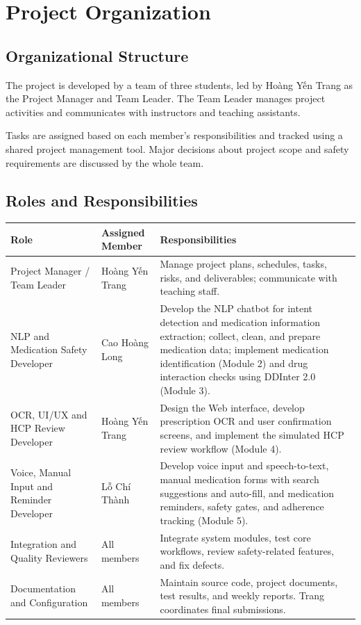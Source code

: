 
\section{Project Organization}

\subsection{Organizational Structure}

The project is developed by a team of three students,
led by Hoàng Yến Trang as the Project Manager and Team Leader.
The Team Leader manages project activities and communicates
with instructors and teaching assistants.

Tasks are assigned based on each member's responsibilities
and tracked using a shared project management tool.
Major decisions about project scope and safety requirements
are discussed by the whole team.

\subsection{Roles and Responsibilities}

\begin{longtable}{|L{0.22\textwidth}|L{0.20\textwidth}|L{0.48\textwidth}|}
\hline
\textbf{Role} &
\textbf{Assigned Member} &
\textbf{Responsibilities}\\ \hline

Project Manager / Team Leader
& Hoàng Yến Trang
& Manage project plans, schedules, tasks, risks,
and deliverables; communicate with teaching staff.
\\ \hline

NLP and Medication Safety Developer
& Cao Hoàng Long
& Develop the NLP chatbot for intent detection and
medication information extraction; collect, clean,
and prepare medication data; implement medication
identification (Module 2) and drug interaction
checks using DDInter 2.0 (Module 3).
\\ \hline

OCR, UI/UX and HCP Review Developer
& Hoàng Yến Trang
& Design the Web interface, develop prescription
OCR and user confirmation screens, and implement
the simulated HCP review workflow (Module 4).
\\ \hline

Voice, Manual Input and Reminder Developer
& Lỗ Chí Thành
& Develop voice input and speech-to-text,
manual medication forms with search suggestions
and auto-fill, and medication reminders,
safety gates, and adherence tracking (Module 5).
\\ \hline

Integration and Quality Reviewers
& All members
& Integrate system modules, test core workflows,
review safety-related features, and fix defects.
\\ \hline

Documentation and Configuration
& All members
& Maintain source code, project documents,
test results, and weekly reports.
Trang coordinates final submissions.
\\ \hline

\end{longtable}
